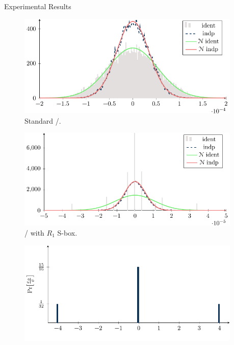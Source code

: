 \begin{columns}[t]
\begin{column}{\sepwid}\end{column}\begin{column}{\twocolwid}

\begin{block}{Experimental Results}
	\begin{minipage}{0.245\textwidth}
		\begin{figure}[ht!]
			\includegraphics[keepaspectratio,width=\textwidth]{figures/distribution_present/plot.pdf}
			\caption{Standard \present/.}\label{fig:std_present}
		\end{figure}
	\end{minipage}
	\begin{minipage}{0.245\textwidth}
		\begin{figure}[ht!]
			\includegraphics[keepaspectratio,width=\textwidth]{figures/distribution_r1/plot.pdf}
			\caption{\present/ with $R_1$ S-box.}\label{fig:present_r1}
		\end{figure}
	\end{minipage}
	\begin{minipage}{0.245\textwidth}
		\begin{figure}[ht!]
			\includegraphics[keepaspectratio,width=\textwidth]{figures/distribution_convergence/plot.pdf}

\end{figure}
\end{minipage}
\end{block}
\end{column}
\end{columns}
